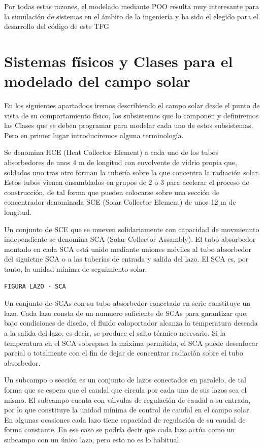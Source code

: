 \documentclass[12pt]{report} %
\begin{document}
Por todas estas razones, el modelado mediante POO resulta muy interesante para la simulación de sistemas en el ámbito de la ingeniería y ha sido el elegido para el desarrollo del código de este TFG 
\section{Sistemas físicos y Clases para el modelado del campo solar}

En los siguientes apartadoos iremos describiendo el campo solar desde el punto de vista de su comportamiento físico, los subsistemas que lo componen y definiremos las Clases que se deben programar para modelar cada uno de estos subsistemas. Pero en primer lugar introduciremos alguna terminología.

Se denomina HCE (Heat Collector Element) a cada uno de los tubos absorbedores de unos 4 m de longitud con envolvente de vidrio propia que, soldados uno tras otro forman la tubería sobre la que concentra la radiación solar. Estos tubos vienen ensamblados en grupos de 2 o 3 para acelerar el proceso de construcción, de tal forma que pueden colocarse sobre una sección de concentrador denominada SCE (Solar Collector Element) de unos 12 m de longitud.

Un conjunto de SCE que se mueven solidariamente con capacidad de movmiennto independiente se denomina SCA (Solar Collector Assambly). El tubo absorbedor montado en cada SCA está unido mediante uniones móviles al tubo absorbedor del siguietne SCA o a las tuberías de entrada y salida del lazo. El SCA es, por tanto, la unidad mínima de seguimiento solar.

\begin{verbatim}
FIGURA LAZO - SCA
\end{verbatim}

Un conjunto de SCAs con su tubo absorbedor conectado en serie constituye un lazo. Cada lazo consta de un numuero suficiente de SCAs para garantizar que, bajo condiciones de diseño, el fluido caloportador alcanza la temperatura deseada a la salida del lazo, es decir, se produce el salto térmico necesario. Si la temperatura en el SCA sobrepasa la máxima permitida, el SCA puede desenfocar parcial o totalmente con el fin de dejar de concentrar radiación sobre el tubo absorbedor.

Un subcampo o sección es un conjunto de lazos conectados en paralelo, de tal forma que se espera que el caudal que circula por cada uno de sus lazos sea el mismo. El subcampo cuenta con válvulas de regulación de caudal a su entrada, por lo que constituye la unidad mínima de control de caudal en el campo solar. En algunas ocasiones cada lazo tiene capacidad de regulación de su caudal de forma constante. En ese caso se podría decir que cada lazo actúa como un subcampo con un único lazo, pero esto no es lo habitual.
\end{document}
